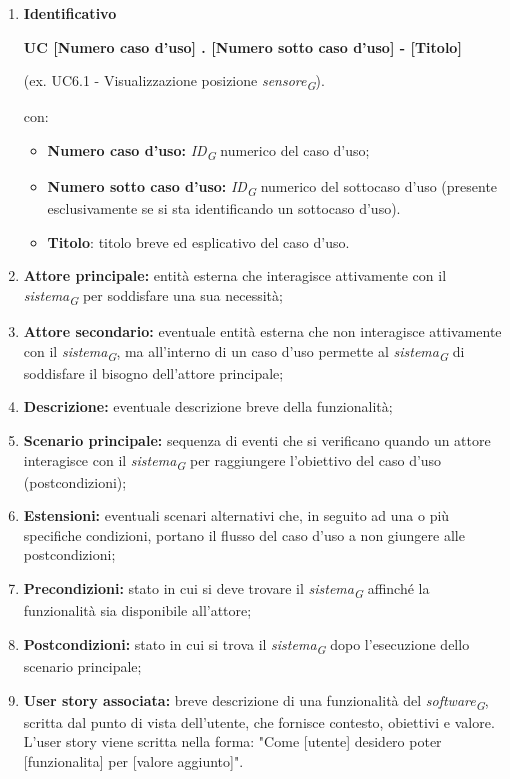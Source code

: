 \begin{enumerate}
    \item \textbf{Identificativo}
    \begin{center}
        \textbf{UC [Numero caso d'uso] . [Numero sotto caso d'uso] - [Titolo]}
    \end{center}
    (ex. UC6.1 - Visualizzazione posizione \textit{sensore}\textsubscript{\textit{G}}).
    
    con:

    \begin{itemize}
        \item \textbf{Numero caso d'uso:} \textit{ID}\textsubscript{\textit{G}} numerico del caso d'uso;
        \item \textbf{Numero sotto caso d'uso:} \textit{ID}\textsubscript{\textit{G}} numerico del sottocaso d'uso (presente esclusivamente se si sta identificando un sottocaso d'uso).
        \item \textbf{Titolo}: titolo breve ed esplicativo del caso d'uso.
    \end{itemize}

    \item \textbf{Attore principale:} entità esterna che interagisce attivamente con il \textit{sistema}\textsubscript{\textit{G}} per soddisfare una sua necessità;
    \item \textbf{Attore secondario:} eventuale entità esterna che non interagisce attivamente con il \textit{sistema}\textsubscript{\textit{G}}, ma all'interno di un caso d'uso permette al \textit{sistema}\textsubscript{\textit{G}} di soddisfare il bisogno dell'attore principale;
    \item \textbf{Descrizione:} eventuale descrizione breve della funzionalità;
    \item \textbf{Scenario principale:} sequenza di eventi che si verificano quando un attore interagisce con il \textit{sistema}\textsubscript{\textit{G}} per raggiungere l'obiettivo del caso d'uso (postcondizioni);
    \item \textbf{Estensioni:} eventuali scenari alternativi che, in seguito ad una o più specifiche condizioni, portano il flusso del caso d'uso a non giungere alle postcondizioni;
    \item \textbf{Precondizioni:} stato in cui si deve trovare il \textit{sistema}\textsubscript{\textit{G}} affinché la funzionalità sia disponibile all'attore;
    \item \textbf{Postcondizioni:} stato in cui si trova il \textit{sistema}\textsubscript{\textit{G}} dopo l'esecuzione dello scenario principale;
    \item \textbf{User story associata:} breve descrizione di una funzionalità del \textit{software}\textsubscript{\textit{G}}, scritta dal punto di vista dell'utente, che fornisce contesto, obiettivi e valore. \\
    L'user story viene scritta nella forma: "Come [utente] desidero poter [funzionalita] per [valore aggiunto]".
\end{enumerate}


